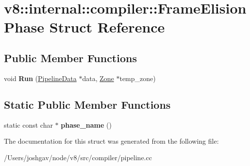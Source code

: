 \hypertarget{structv8_1_1internal_1_1compiler_1_1_frame_elision_phase}{}\section{v8\+:\+:internal\+:\+:compiler\+:\+:Frame\+Elision\+Phase Struct Reference}
\label{structv8_1_1internal_1_1compiler_1_1_frame_elision_phase}
\subsection*{Public Member Functions}
\begin{DoxyCompactItemize}
\item 
void {\bfseries Run} (\hyperlink{classv8_1_1internal_1_1compiler_1_1_pipeline_data}{Pipeline\+Data} $\ast$data, \hyperlink{classv8_1_1internal_1_1_zone}{Zone} $\ast$temp\+\_\+zone)\hypertarget{structv8_1_1internal_1_1compiler_1_1_frame_elision_phase_a8e7f6405822771ab97a6f07fd2a576fd}{}\label{structv8_1_1internal_1_1compiler_1_1_frame_elision_phase_a8e7f6405822771ab97a6f07fd2a576fd}

\end{DoxyCompactItemize}
\subsection*{Static Public Member Functions}
\begin{DoxyCompactItemize}
\item 
static const char $\ast$ {\bfseries phase\+\_\+name} ()\hypertarget{structv8_1_1internal_1_1compiler_1_1_frame_elision_phase_a111eaecc3740e63fd7024b0c0d76c474}{}\label{structv8_1_1internal_1_1compiler_1_1_frame_elision_phase_a111eaecc3740e63fd7024b0c0d76c474}

\end{DoxyCompactItemize}


The documentation for this struct was generated from the following file\+:\begin{DoxyCompactItemize}
\item 
/\+Users/joshgav/node/v8/src/compiler/pipeline.\+cc\end{DoxyCompactItemize}
